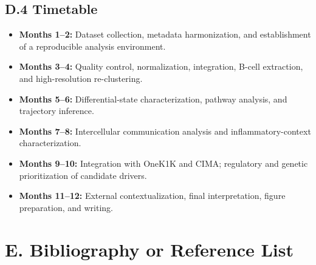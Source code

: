 \documentclass[12pt, a4paper]{article}
\begin{document}
\subsection*{D.4 Timetable}
\begin{itemize}
    \item \textbf{Months 1--2:} Dataset collection, metadata harmonization, and establishment of a reproducible analysis environment.
    \item \textbf{Months 3--4:} Quality control, normalization, integration, B-cell extraction, and high-resolution re-clustering.
    \item \textbf{Months 5--6:} Differential-state characterization, pathway analysis, and trajectory inference.
    \item \textbf{Months 7--8:} Intercellular communication analysis and inflammatory-context characterization.
    \item \textbf{Months 9--10:} Integration with OneK1K and CIMA; regulatory and genetic prioritization of candidate drivers.
    \item \textbf{Months 11--12:} External contextualization, final interpretation, figure preparation, and writing.
\end{itemize}

\newpage
\section*{E. Bibliography or Reference List}
\end{document}
